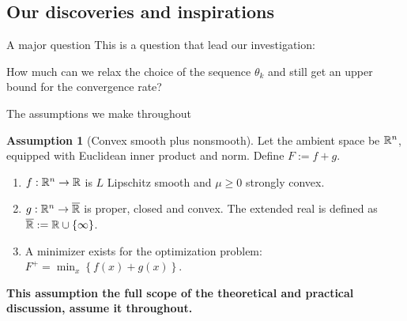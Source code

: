\documentclass[11pt]{beamer}
\theoremstyle{definition}
\newtheorem{assumption}{Assumption}[section]
\begin{document}
    \subsection{Our discoveries and inspirations}
        \begin{frame}{A major question}
            This is a question that lead our investigation: 
            \begin{tcolorbox}
                How much can we relax the choice of the sequence $\theta_k$ and still get an upper bound for the convergence rate? 
            \end{tcolorbox}
        \end{frame}
        \begin{frame}{The assumptions we make throughout}
            \begin{assumption}[Convex smooth plus nonsmooth]
                Let the ambient space be $\mathbb R^n$, equipped with Euclidean inner product and norm. 
                Define $F := f + g$.
                \begin{enumerate}
                    \item $f: \mathbb R^n \rightarrow \mathbb R$ is $L$ Lipschitz smooth and $\mu \ge 0$ strongly convex.
                    \item $g: \mathbb R^n \rightarrow \overline {\mathbb R}$ is proper, closed and convex. The extended real is defined as $\overline {\mathbb R} := \mathbb R \cup \{\infty\}$.
                    \item A minimizer exists for the optimization problem: $F^+ = \min_x \left\lbrace f(x) + g(x)\right\rbrace$.
                \end{enumerate}
            \end{assumption}
            \textbf{This assumption the full scope of the theoretical and practical discussion, assume it throughout.}
        \end{frame}
\end{document}
